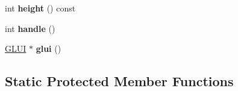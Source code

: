 \begin{DoxyCompactItemize}
\item 
\hypertarget{classBaseGfxApp_aa253dbe16a20c40e0a1bf8ff942ceea3}{int {\bfseries height} () const }\label{classBaseGfxApp_aa253dbe16a20c40e0a1bf8ff942ceea3}

\item 
\hypertarget{classBaseGfxApp_ae9779f948eff6f45beec08091e98a803}{int {\bfseries handle} ()}\label{classBaseGfxApp_ae9779f948eff6f45beec08091e98a803}

\item 
\hypertarget{classBaseGfxApp_ac721a0fedce80308c5c0e5695016e95d}{\hyperlink{classGLUI}{G\-L\-U\-I} $\ast$ {\bfseries glui} ()}\label{classBaseGfxApp_ac721a0fedce80308c5c0e5695016e95d}

\end{DoxyCompactItemize}
\subsection*{Static Protected Member Functions}
